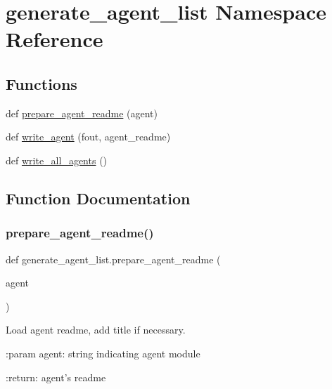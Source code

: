 \hypertarget{namespacegenerate__agent__list}{}\section{generate\+\_\+agent\+\_\+list Namespace Reference}
\label{namespacegenerate__agent__list}
\subsection*{Functions}
\begin{DoxyCompactItemize}
\item 
def \hyperlink{namespacegenerate__agent__list_a321a9312fef0cf377ee0e8a870ee0741}{prepare\+\_\+agent\+\_\+readme} (agent)
\item 
def \hyperlink{namespacegenerate__agent__list_aa2e399b6d39f8bb4e2f2ef644f082ac7}{write\+\_\+agent} (fout, agent\+\_\+readme)
\item 
def \hyperlink{namespacegenerate__agent__list_a27877babb0738c546513fb040748be63}{write\+\_\+all\+\_\+agents} ()
\end{DoxyCompactItemize}


\subsection{Function Documentation}
\mbox{\label{namespacegenerate__agent__list_a321a9312fef0cf377ee0e8a870ee0741}} 
\subsubsection{\texorpdfstring{prepare\+\_\+agent\+\_\+readme()}{prepare\_agent\_readme()}}
{\footnotesize\ttfamily def generate\+\_\+agent\+\_\+list.\+prepare\+\_\+agent\+\_\+readme (\begin{DoxyParamCaption}\item[{}]{agent }\end{DoxyParamCaption})}

\begin{DoxyVerb}Load agent readme, add title if necessary.

:param agent:
    string indicating agent module

:return:
    agent's readme
\end{DoxyVerb}
 


